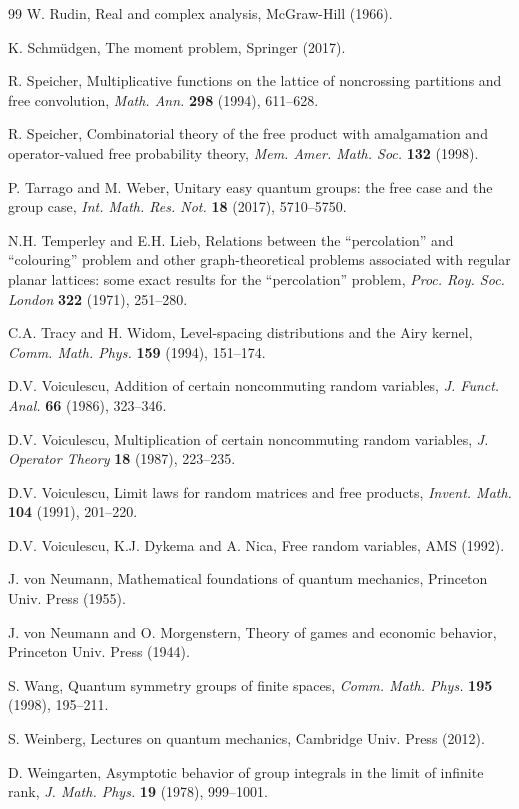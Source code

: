 \documentclass[12pt]{amsbook}
\begin{document}
\begin{thebibliography}{99}
W. Rudin, Real and complex analysis, McGraw-Hill (1966).

K. Schm\"udgen, The moment problem, Springer (2017).

R. Speicher, Multiplicative functions on the lattice of noncrossing partitions and free convolution, {\em Math. Ann.} {\bf 298} (1994), 611--628.

R. Speicher, Combinatorial theory of the free product with amalgamation and operator-valued free probability theory, {\em Mem. Amer. Math. Soc.} {\bf 132} (1998).

P. Tarrago and M. Weber, Unitary easy quantum groups: the free case and the group case, {\em Int. Math. Res. Not.} {\bf 18} (2017), 5710--5750.

N.H. Temperley and E.H. Lieb, Relations between the ``percolation'' and ``colouring'' problem and other graph-theoretical problems associated with regular planar lattices: some exact results for the ``percolation'' problem, {\em Proc. Roy. Soc. London} {\bf 322} (1971), 251--280.

C.A. Tracy and H. Widom, Level-spacing distributions and the Airy kernel, {\em Comm. Math. Phys.} {\bf 159} (1994), 151--174.

D.V. Voiculescu, Addition of certain noncommuting random variables, {\em J. Funct. Anal.} {\bf 66} (1986), 323--346.

D.V. Voiculescu, Multiplication of certain noncommuting random variables, {\em J. Operator Theory} {\bf 18} (1987), 223--235.

D.V. Voiculescu, Limit laws for random matrices and free products, {\em Invent. Math.} {\bf 104} (1991), 201--220.

D.V. Voiculescu, K.J. Dykema and A. Nica, Free random variables, AMS (1992).

J. von Neumann, Mathematical foundations of quantum mechanics, Princeton Univ. Press (1955).

J. von Neumann and O. Morgenstern, Theory of games and economic behavior, Princeton Univ. Press (1944).

S. Wang, Quantum symmetry groups of finite spaces, {\em Comm. Math. Phys.} {\bf 195} (1998), 195--211.

S. Weinberg, Lectures on quantum mechanics, Cambridge Univ. Press (2012).

D. Weingarten, Asymptotic behavior of group integrals in the limit of infinite rank, {\em J. Math. Phys.} {\bf 19} (1978), 999--1001.


\end{thebibliography}
\end{document}
